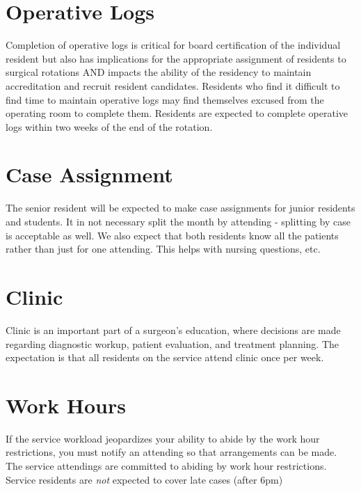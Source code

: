 \documentclass[
]{book}
\begin{document}
\hypertarget{operative-logs}{%
\section{Operative Logs}\label{operative-logs}}

Completion of operative logs is critical for board certification of the individual resident but also has implications for the appropriate assignment of residents to surgical rotations AND impacts the ability of the residency to maintain accreditation and recruit resident candidates. Residents who find it difficult to find time to maintain operative logs may find themselves excused from the operating room to complete them. Residents are expected to complete operative logs within two weeks of the end of the rotation.

\hypertarget{case-assignment}{%
\section{Case Assignment}\label{case-assignment}}

The senior resident will be expected to make case assignments for junior residents and students. It in not necessary split the month by attending - splitting by case is acceptable as well. We also expect that both residents know all the patients rather than just for one attending. This helps with nursing questions, etc.

\hypertarget{clinic}{%
\section{Clinic}\label{clinic}}

Clinic is an important part of a surgeon's education, where decisions are made regarding diagnostic workup, patient evaluation, and treatment planning. The expectation is that all residents on the service attend clinic once per week.

\hypertarget{work-hours}{%
\section{Work Hours}\label{work-hours}}

If the service workload jeopardizes your ability to abide by the work hour restrictions, you must notify an attending so that arrangements can be made. The service attendings are committed to abiding by work hour restrictions. Service residents are \emph{not} expected to cover late cases (after 6pm)
\end{document}
